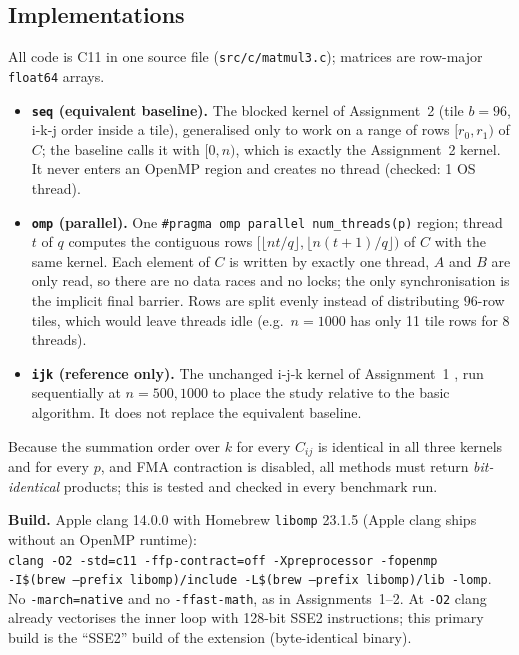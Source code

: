 \subsection{Implementations}
All code is C11 in one source file (\texttt{src/c/matmul3.c}); matrices are row-major \texttt{float64} arrays.
\begin{itemize}
\item \textbf{\texttt{seq} (equivalent baseline).} The blocked kernel of Assignment~2 \cite{a2} (tile $b=96$, i-k-j order inside
a tile), generalised only to work on a range of rows $[r_0,r_1)$ of $C$; the baseline calls it with $[0,n)$, which is exactly the
Assignment~2 kernel. It never enters an OpenMP region and creates no thread (checked: 1 OS thread).
\item \textbf{\texttt{omp} (parallel).} One \texttt{\#pragma omp parallel num\_threads(p)} region; thread $t$ of $q$ computes the
contiguous rows $[\lfloor nt/q\rfloor,\lfloor n(t+1)/q\rfloor)$ of $C$ with the same kernel. Each element of $C$ is written by exactly
one thread, $A$ and $B$ are only read, so there are no data races and no locks; the only synchronisation is the implicit final barrier.
Rows are split evenly instead of distributing $96$-row tiles, which would leave threads idle (e.g.\ $n=1000$ has only 11 tile rows for 8 threads).
\item \textbf{\texttt{ijk} (reference only).} The unchanged i-j-k kernel of Assignment~1 \cite{a1}, run sequentially at $n=500,1000$
to place the study relative to the basic algorithm. It does not replace the equivalent baseline.
\end{itemize}
Because the summation order over $k$ for every $C_{ij}$ is identical in all three kernels and for every $p$, and FMA contraction is
disabled, all methods must return \emph{bit-identical} products; this is tested and checked in every benchmark run.

\textbf{Build.} Apple clang 14.0.0 with Homebrew \texttt{libomp} 23.1.5 (Apple clang ships without an OpenMP runtime):
\\\hspace*{1.5em}\texttt{clang -O2 -std=c11 -ffp-contract=off -Xpreprocessor -fopenmp}\\\hspace*{1.5em}\texttt{-I\$(brew --prefix libomp)/include -L\$(brew --prefix libomp)/lib -lomp}.\\
No \texttt{-march=native} and no \texttt{-ffast-math}, as in Assignments~1--2. At \texttt{-O2} clang already vectorises the inner loop with
128-bit SSE2 instructions; this primary build is the ``SSE2'' build of the extension (byte-identical binary).

